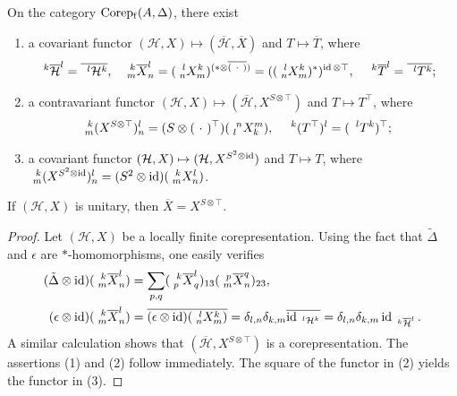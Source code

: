 \begin{Lem} \label{lemma:rep-functors}
   On the category
  $\Corep(A,\Delta)$, there exist
  \begin{enumerate}
  \item a covariant functor $(\mathcal{H},X) \mapsto
    (\overline{\mathcal{H}},\overline{X})$ and $T \mapsto
    \overline{T}$, where
    \begin{align*}
      \Gru{\overline{\mathcal{H}}}{k}{l} &= \overline{\Gru{\mathcal{H}}{l}{k}},
      & \Gr{\overline{X}}{k}{l}{m}{n} &= (\Gr{X}{l}{k}{n}{m})^{(*
        \otimes \overline{(\ \cdot \ ) })}
      =((\Gr{X}{l}{k}{n}{m})^{*})^{\id \otimes \top}, &
      \Gru{\overline{T}}{k}{l} &= \overline{\Gru{T}{l}{k}};
    \end{align*}
  \item a contravariant functor $(\mathcal{H},X) \mapsto
    (\overline{\mathcal{H}},X^{S\otimes \top})$ and
    $T\mapsto T^{\top}$, where 
    \begin{align*}
      \Gr{(X^{S\otimes \top})}{k}{l}{m}{n} &= (S \otimes (\ \cdot \
      )^{\top})(\Gr{X}{n}{m}{l}{k}), & \Gru{(T^{\top})}{k}{l}
      &=(\Gru{T}{l}{k})^{\top};
    \end{align*}
  \item a covariant functor  $(\mathcal{H},X) \mapsto (\mathcal{H},X^{S^{2}\otimes \id})$
    and $T\mapsto T$, where $\Gr{(X^{S^{2}\otimes \id})}{k}{l}{m}{n}=(S^{2} \otimes
  \id)(\Gr{X}{k}{l}{m}{n})$.
  \end{enumerate}
  If $(\mathcal{H},X)$ is unitary, then $\overline{X}=X^{S\otimes \top}$.\end{Lem}
\begin{proof}
  Let $(\mathcal{H},X)$ be a locally finite corepresentation. Using the fact that $\tilde \Delta$ and $\epsilon$ are
  $*$-homomorphisms, one easily verifies
  \begin{align*}
    (\tilde \Delta \otimes \id)( \Gr{\overline{X}}{k}{l}{m}{n}) &=
    \sum_{p,q} ( \Gr{\overline{X}}{k}{l}{p}{q})_{13}
    ( \Gr{\overline{X}}{p}{q}{m}{n})_{23}, \\
    (\epsilon \otimes \id)(\Gr{\overline{X}}{k}{l}{m}{n}) &=
    \overline{(\epsilon \otimes \id)(\Gr{X}{l}{k}{n}{m})}
    = \delta_{l,n}\delta_{k,m}
    \overline{\id_{\Gru{\mathcal{H}}{l}{k}}}
    = \delta_{l,n}\delta_{k,m} \id_{\Gru{\overline{\mathcal{H}}}{k}{l}}.
  \end{align*}
  A similar calculation shows that
  $(\overline{\mathcal{H}},X^{S\otimes \top})$ is a
  corepresentation. The assertions (1) and (2) follow
  immediately. The square of the functor in (2) yields the functor in
  (3).  
\end{proof}
